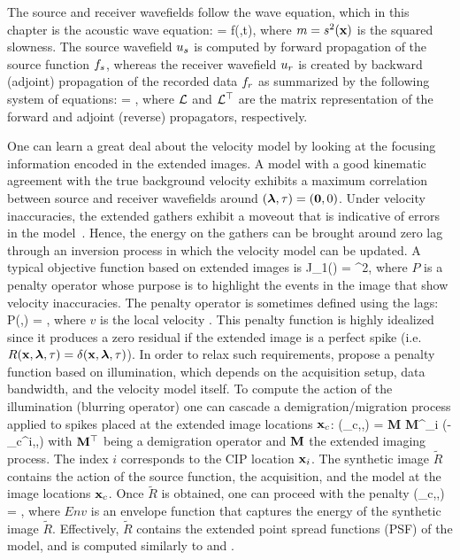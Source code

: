 The source and receiver wavefields follow the wave equation, which in this chapter is the
acoustic wave equation: 
\beq
   = f(\xx,t),
\label{eq:we}
\eeq
where $m=s^2({\bf x})$ is the squared slowness. The source wavefield $u_s$ is computed by forward
propagation of the source function ${f_s}$, whereas the receiver wavefield $u_r$ is created by backward (adjoint)
propagation of the recorded data ${f_r}$ as summarized by the following system of equations:
\beq \label{eqn:FSV}
\MAT{ \us \\ \ur} =
\MAT{ \fs \\ \fr} ,
\eeq
where $\mathcal{L}$ and $\mathcal{L}^\top$ are the matrix representation of the forward and adjoint (reverse) propagators, respectively. 

One can learn a great deal about the velocity model by looking at the focusing information
encoded in the extended images. A model with a good kinematic agreement with 
the true background velocity exhibits 
a maximum correlation between source and receiver wavefields around $({\boldsymbol{\lambda}},\tau)=({\bf 0},0)$. Under velocity 
inaccuracies, the
extended gathers exhibit a moveout that is indicative of 
 errors in the model~\citep{YangSava:moveout}. Hence,
 the energy on the gathers can be brought around zero lag through an
inversion process in which the velocity model can be updated. A typical 
objective function \citep{ShenSymes.geo.2008,Wiktor,tony:gp15} based on 
extended images is 
\beq
 J_1(\m) = ^2,
\eeq
where $P$ is a penalty operator whose purpose is to 
highlight the events in the image that show velocity inaccuracies. 
 The penalty operator is sometimes defined using the lags:
\beq
  P(\hh,\tau) = ,
\eeq
where $v$ is the local velocity \citep{tony:gp15}. This penalty function is 
highly idealized since it produces a zero residual if the 
extended image is a perfect spike (i.e. $R({\bf x},{\boldsymbol{\lambda}},\tau)=\delta({\bf x},{\boldsymbol{\lambda}},\tau)$).
 In order to relax such requirements, \cite{tony_seg:cwp12} propose
a penalty function based on illumination, which depends on the 
acquisition setup, data bandwidth, and the velocity model itself. 
 To compute the action of the illumination (blurring  
operator) one can cascade a demigration/migration process 
applied to spikes placed at the extended image locations ${\bf x}_c$:
\beq
  (\xx_c,\hh,\tau) = {\bf M} {\bf M}^\top \sum_{i} \delta(\xx-\xx_c^i,\hh,\tau)
\eeq
with $\bf M^\top$ being a demigration operator and $\bf M$ the extended imaging process. The index
$i$ corresponds to the CIP location ${\bf x}_i$.
 The synthetic image $\tilde{R}$ contains the action of the source function, the acquisition, 
and the model at the image locations ${\bf x}_c$. Once $\tilde{R}$ is obtained, one can 
proceed with the penalty 
\beq
  (\xx_c,\hh,\tau) = ,
\eeq
where $Env$ is an envelope function that captures the energy of the synthetic  
image $\tilde{R}$.
Effectively, $\tilde{R}$ contains the extended point spread functions (PSF) of the model, 
and is computed similarly to \cite{valenciano:2009} and \cite{FletcherLSM}.


